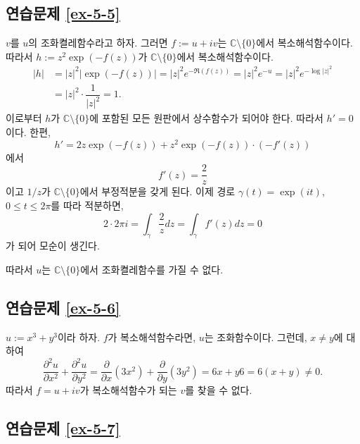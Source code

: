 \subsection*{연습문제 \ref{ex-5-5}}

$v$를 $u$의 조화켤레함수라고 하자.
그러면 $f:= u+iv$는 $\mathbb C\setminus \{0\}$에서
복소해석함수이다. 
따라서 $h:= z^2 \exp(-f(z))$가 $\mathbb C\setminus \{0\}$에서
복소해석함수이다. 
\begin{align*}
|h| & = |z|^2|\exp(-f(z))| = |z|^2 e^{-\Re(f(z))} = |z|^2e^{-u}
= |z|^2e^{-\log |z|^2} \\
&= |z|^2\cdot \dfrac1{|z|^2} = 1.
\end{align*}
이로부터 $h$가 $\mathbb C\setminus \{0\}$에 포함된 모든 원판에서 상수함수가 되어야 한다.
따라서 $h'=0$이다.
한편,
\[
h' = 2z \exp(-f(z)) + z^2\exp(-f(z))\cdot (-f'(z))
\]
에서
\[
f'(z) = \dfrac2z
\]
이고 $1/z$가 $\mathbb C\setminus \{0\}$에서 부정적분을 갖게 된다.
이제 경로 $\gamma(t) =\exp(it)$, $0\le t \le 2\pi$를 따라 적분하면,
\[
2\cdot 2\pi i = \int_\gamma \dfrac2z dz = \int_\gamma f'(z)dz = 0
\]
가 되어 모순이 생긴다.

따라서 $u$는 $\mathbb C\setminus \{0\}$에서 조화켤레함수를 가질 수 없다.

\subsection*{연습문제 \ref{ex-5-6}}

$u:=x^3+y^3$이라 하자.
$f$가 복소해석함수라면, $u$는 조화함수이다.
그런데, $x\ne y$에 대하여
\[
\dfrac{\partial^2 u}{\partial x^2} + \dfrac{\partial^2 u}{\partial y^2}
= \dfrac{\partial}{\partial x}(3x^2) + \dfrac{\partial}{\partial y}(3y^2)
= 6x + y6 = 6(x+y) \ne 0.
\]
따라서 $f=u+iv$가 복소해석함수가 되는 $v$를 찾을 수 없다.

\subsection*{연습문제 \ref{ex-5-7}}

